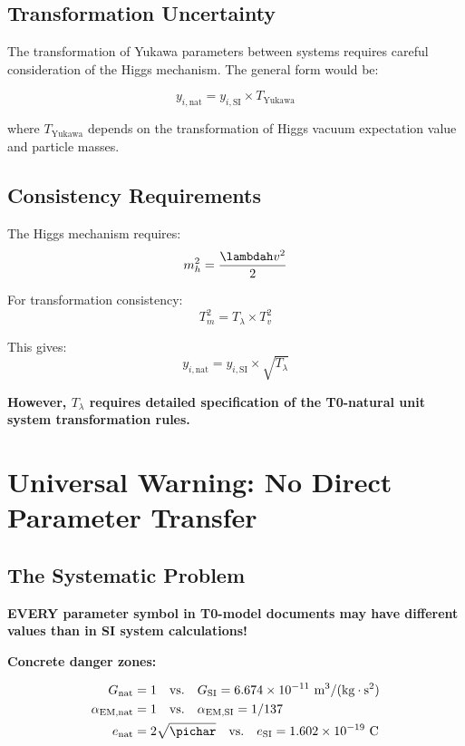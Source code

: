 	\subsection{Transformation Uncertainty}
	\label{subsec:yukawa_transformation}
	
	The transformation of Yukawa parameters between systems requires careful consideration of the Higgs mechanism. The general form would be:
	
	$$y_{i,\text{nat}} = y_{i,\text{SI}} \times T_{\text{Yukawa}}$$
	
	where $T_{\text{Yukawa}}$ depends on the transformation of Higgs vacuum expectation value and particle masses.
	
	\subsection{Consistency Requirements}
	\label{subsec:yukawa_consistency}
	
	The Higgs mechanism requires:
	$$m_h^2 = \frac{\lambdah v^2}{2}$$
	
	For transformation consistency:
	$$T_m^2 = T_\lambda \times T_v^2$$
	
	This gives:
	$$y_{i,\text{nat}} = y_{i,\text{SI}} \times \sqrt{T_\lambda}$$
	
	\textbf{However, $T_\lambda$ requires detailed specification of the T0-natural unit system transformation rules.}
	
	\section{Universal Warning: No Direct Parameter Transfer}
	\label{sec:universal_warning}
	
	\subsection{The Systematic Problem}
	\label{subsec:systematic_problem}
	
	\begin{warning}
		\textbf{EVERY parameter symbol in T0-model documents may have different values than in SI system calculations!}
	\end{warning}
	
	\textbf{Concrete danger zones:}
	
	\begin{align}
		G_{\text{nat}} &= 1 \quad \text{vs.} \quad G_{\text{SI}} = 6.674 \times 10^{-11} \text{ m}^3/(\text{kg} \cdot \text{s}^2) \\
		\alpha_{\text{EM,nat}} &= 1 \quad \text{vs.} \quad \alpha_{\text{EM,SI}} = 1/137 \\
		e_{\text{nat}} &= 2\sqrt{\pichar} \quad \text{vs.} \quad e_{\text{SI}} = 1.602 \times 10^{-19} \text{ C}
	\end{align}
	
